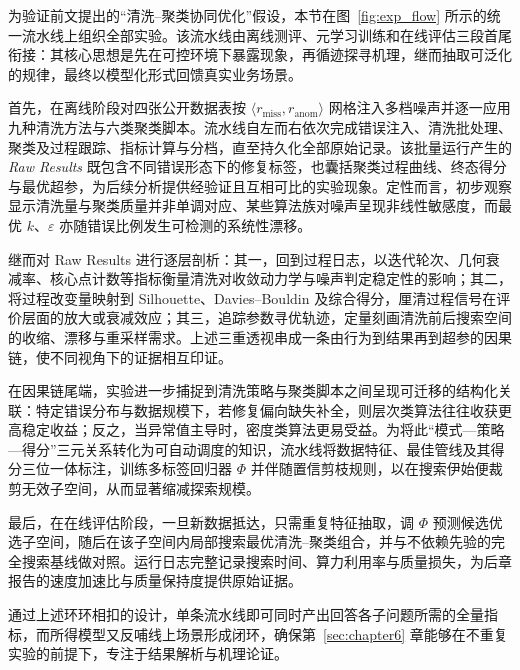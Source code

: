 \documentclass[10pt]{article} %
\numberwithin{equation}{section}
\begin{document}
为验证前文提出的“清洗\;--\;聚类协同优化”假设，本节在图~\ref{fig:exp_flow} 所示的统一流水线上组织全部实验。该流水线由离线测评、元学习训练和在线评估三段首尾衔接：其核心思想是先在可控环境下暴露现象，再循迹探寻机理，继而抽取可泛化的规律，最终以模型化形式回馈真实业务场景。

首先，在离线阶段对四张公开数据表按 \(\langle r_{\text{miss}},r_{\text{anom}}\rangle\) 网格注入多档噪声并逐一应用九种清洗方法与六类聚类脚本。流水线自左而右依次完成错误注入、清洗批处理、聚类及过程跟踪、指标计算与分档，直至持久化全部原始记录。该批量运行产生的 \textit{Raw Results} 既包含不同错误形态下的修复标签，也囊括聚类过程曲线、终态得分与最优超参，为后续分析提供经验证且互相可比的实验现象。定性而言，初步观察显示清洗量与聚类质量并非单调对应、某些算法族对噪声呈现非线性敏感度，而最优 \(k\)、\(\varepsilon\) 亦随错误比例发生可检测的系统性漂移。

继而对 Raw Results 进行逐层剖析：其一，回到过程日志，以迭代轮次、几何衰减率、核心点计数等指标衡量清洗对收敛动力学与噪声判定稳定性的影响；其二，将过程改变量映射到 Silhouette、Davies–Bouldin 及综合得分，厘清过程信号在评价层面的放大或衰减效应；其三，追踪参数寻优轨迹，定量刻画清洗前后搜索空间的收缩、漂移与重采样需求。上述三重透视串成一条由行为到结果再到超参的因果链，使不同视角下的证据相互印证。

在因果链尾端，实验进一步捕捉到清洗策略与聚类脚本之间呈现可迁移的结构化关联：特定错误分布与数据规模下，若修复偏向缺失补全，则层次类算法往往收获更高稳定收益；反之，当异常值主导时，密度类算法更易受益。为将此“模式—策略—得分”三元关系转化为可自动调度的知识，流水线将数据特征、最佳管线及其得分三位一体标注，训练多标签回归器 \(\varPhi\) 并伴随置信剪枝规则，以在搜索伊始便裁剪无效子空间，从而显著缩减探索规模。

最后，在在线评估阶段，一旦新数据抵达，只需重复特征抽取，调 \(\varPhi\) 预测候选优选子空间，随后在该子空间内局部搜索最优清洗\;--\;聚类组合，并与不依赖先验的完全搜索基线做对照。运行日志完整记录搜索时间、算力利用率与质量损失，为后章报告的速度加速比与质量保持度提供原始证据。

通过上述环环相扣的设计，单条流水线即可同时产出回答各子问题所需的全量指标，而所得模型又反哺线上场景形成闭环，确保第~\ref{sec:chapter6} 章能够在不重复实验的前提下，专注于结果解析与机理论证。
\end{document}
